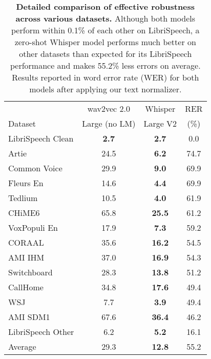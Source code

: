 \documentclass[nohyperref]{article}
\theoremstyle{plain}
\theoremstyle{definition}
\theoremstyle{remark}
\begin{document}
\begin{table}[t]
\vskip 0.15in
\small
\begin{center}
\begin{tabular}{l|cc|c}
\toprule
& wav2vec 2.0 & Whisper & RER \\
Dataset & Large (no LM) & Large V2 & (\%) \\
\midrule
LibriSpeech Clean & \textbf{2.7} & \textbf{2.7} & 0.0 \\
\midrule
Artie & 24.5 & \textbf{6.2} & \color{Highlight}74.7 \\
Common Voice & 29.9 & \textbf{9.0} & \color{Highlight}69.9 \\
Fleurs En & 14.6 & \textbf{4.4} & \color{Highlight}69.9 \\
Tedlium & 10.5 & \textbf{4.0} & \color{Highlight}61.9 \\
CHiME6 & 65.8 & \textbf{25.5} & \color{Highlight}61.2 \\
VoxPopuli En & 17.9 & \textbf{7.3} & \color{Highlight}59.2 \\
CORAAL & 35.6 & \textbf{16.2} & \color{Highlight}54.5 \\
AMI IHM & 37.0 & \textbf{16.9} & \color{Highlight}54.3 \\
Switchboard & 28.3 & \textbf{13.8} & \color{Highlight}51.2 \\
CallHome & 34.8 & \textbf{17.6} & \color{Highlight}49.4 \\
WSJ & 7.7 & \textbf{3.9} & \color{Highlight}49.4 \\
AMI SDM1 & 67.6 & \textbf{36.4} & \color{Highlight}46.2 \\
LibriSpeech Other & 6.2 & \textbf{5.2} & \color{Highlight}16.1 \\
\midrule
Average & 29.3 & \textbf{12.8} & \color{Highlight}55.2 \\

\bottomrule
\end{tabular}
\caption{\textbf{Detailed comparison of effective robustness across various datasets.} Although both models perform within 0.1\% of each other on LibriSpeech, a zero-shot Whisper model performs much better on other datasets than expected for its LibriSpeech performance and makes 55.2\% less errors on average. Results reported in word error rate (WER) for both models after applying our text normalizer.}
\label{robustness_table}
\end{center}
\vspace{-1em}
\end{table}
\end{document}
